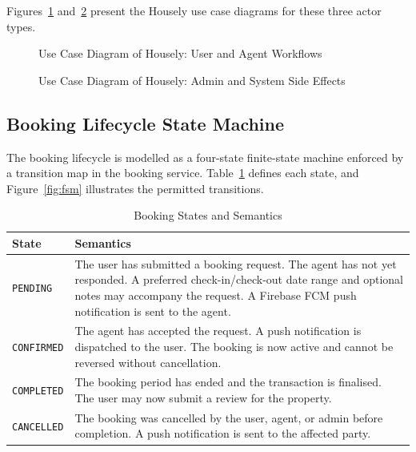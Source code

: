 \documentclass[12pt,a4paper]{report}
\begin{document}
Figures~\ref{fig:uc1} and~\ref{fig:uc2} present the Housely use case diagrams for these
three actor types.

\begin{figure}[H]
\centering
\caption{Use Case Diagram of Housely: User and Agent Workflows}
\label{fig:uc1}
\end{figure}

\begin{figure}[H]
\centering
\caption{Use Case Diagram of Housely: Admin and System Side Effects}
\label{fig:uc2}
\end{figure}

\subsection{Booking Lifecycle State Machine}

The booking lifecycle is modelled as a four-state finite-state machine enforced by a
transition map in the booking service. Table~\ref{tab:booking_states} defines each state,
and Figure~\ref{fig:fsm} illustrates the permitted transitions.

\begin{table}[H]
\caption{Booking States and Semantics}
\label{tab:booking_states}
\centering
\small
{}
\begin{tabularx}{\textwidth}{|l|X|}
\hline
\textbf{State} & \textbf{Semantics} \\
\hline
\texttt{PENDING} & The user has submitted a booking request. The agent has not yet
responded. A preferred check-in/check-out date range and optional notes may accompany
the request. A Firebase FCM push notification is sent to the agent. \\
\hline
\texttt{CONFIRMED} & The agent has accepted the request. A push notification is
dispatched to the user. The booking is now active and cannot be reversed without
cancellation. \\
\hline
\texttt{COMPLETED} & The booking period has ended and the transaction is finalised.
The user may now submit a review for the property. \\
\hline
\texttt{CANCELLED} & The booking was cancelled by the user, agent, or admin before
completion. A push notification is sent to the affected party. \\
\hline
\end{tabularx}
\end{table}
\end{document}
